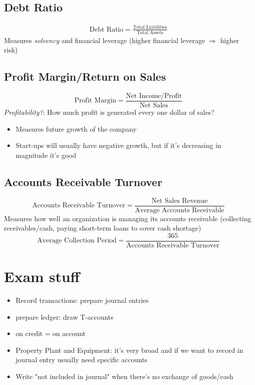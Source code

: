 \documentclass{article}
\begin{document}
\begin{multicols}{2}
\subsection{Debt Ratio}
\begin{equation*}
	\begin{aligned}
		\text{Debt Ratio} = \frac{\text{Total Liabilities}}{\text{Total Assets}}
	\end{aligned}
\end{equation*}
Measures \textit{solvency} and financial leverage (higher financial leverage $\Rightarrow$ higher risk)
\subsection{Profit Margin/Return on Sales}
$$\text{Profit Margin} = \frac{\text{Net Income/Profit}}{\text{Net Sales}}$$
\textit{Profitability?}: How much profit is generated every one dollar of sales?
\begin{itemize}
	\item Measures future growth of the company
	\item Start-ups will usually have negative growth, but if it's decreasing in magnitude it's good
\end{itemize}

\subsection{Accounts Receivable Turnover}
$$\text{Accounts Receivable Turnover} = \frac{\text{Net Sales Revenue}}{\text{Average Accounts Receivable}}$$
Measures how well an organization is managing its accounts receivable (collecting receivables/cash, paying short-term loans to cover cash shortage)
$$\text{Average Collection Period} = \frac{365}{\text{Accounts Receivable Turnover}}$$

\section{Exam stuff}
\begin{itemize}
	\item Record transactions: prepare journal entries
	\item prepare ledger: draw T-accounts
	\item on credit = on account
	\item Property Plant and Equipment: it's very broad and if we want to record in journal entry usually need specific accounts
	\item Write "not included in journal" when there's no exchange of goods/cash
\end{itemize}
\end{multicols}
\end{document}
